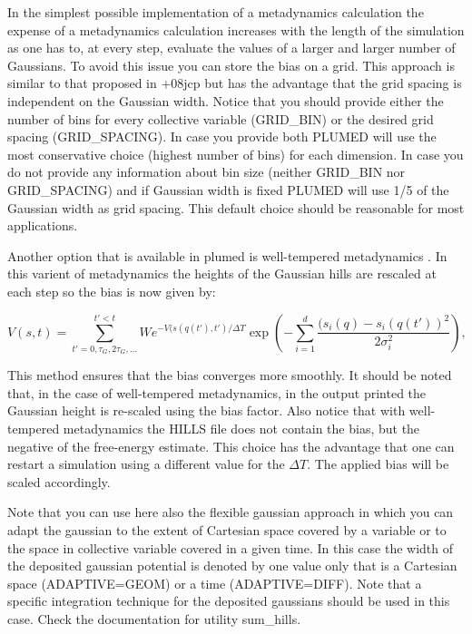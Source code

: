 In the simplest possible implementation of a metadynamics calculation the expense of a metadynamics calculation increases with the length of the simulation as one has to, at every step, evaluate the values of a larger and larger number of Gaussians. To avoid this issue you can store the bias on a grid. This approach is similar to that proposed in \cite{babi}+08jcp but has the advantage that the grid spacing is independent on the Gaussian width. Notice that you should provide either the number of bins for every collective variable (G\+R\+I\+D\+\_\+\+B\+I\+N) or the desired grid spacing (G\+R\+I\+D\+\_\+\+S\+P\+A\+C\+I\+N\+G). In case you provide both P\+L\+U\+M\+E\+D will use the most conservative choice (highest number of bins) for each dimension. In case you do not provide any information about bin size (neither G\+R\+I\+D\+\_\+\+B\+I\+N nor G\+R\+I\+D\+\_\+\+S\+P\+A\+C\+I\+N\+G) and if Gaussian width is fixed P\+L\+U\+M\+E\+D will use 1/5 of the Gaussian width as grid spacing. This default choice should be reasonable for most applications.

Another option that is available in plumed is well-\/tempered metadynamics \cite{Barducci:2008}. In this varient of metadynamics the heights of the Gaussian hills are rescaled at each step so the bias is now given by\+:

\[ V({s},t)= \sum_{t'=0,\tau_G,2\tau_G,\dots}^{t'<t} W e^{-V({s}({q}(t'),t')/\Delta T} \exp\left( -\sum_{i=1}^{d} \frac{(s_i({q})-s_i({q}(t'))^2}{2\sigma_i^2} \right), \]

This method ensures that the bias converges more smoothly. It should be noted that, in the case of well-\/tempered metadynamics, in the output printed the Gaussian height is re-\/scaled using the bias factor. Also notice that with well-\/tempered metadynamics the H\+I\+L\+L\+S file does not contain the bias, but the negative of the free-\/energy estimate. This choice has the advantage that one can restart a simulation using a different value for the $\Delta T$. The applied bias will be scaled accordingly.

Note that you can use here also the flexible gaussian approach \cite{Branduardi:2012dl} in which you can adapt the gaussian to the extent of Cartesian space covered by a variable or to the space in collective variable covered in a given time. In this case the width of the deposited gaussian potential is denoted by one value only that is a Cartesian space (A\+D\+A\+P\+T\+I\+V\+E=G\+E\+O\+M) or a time (A\+D\+A\+P\+T\+I\+V\+E=D\+I\+F\+F). Note that a specific integration technique for the deposited gaussians should be used in this case. Check the documentation for utility sum\+\_\+hills.

